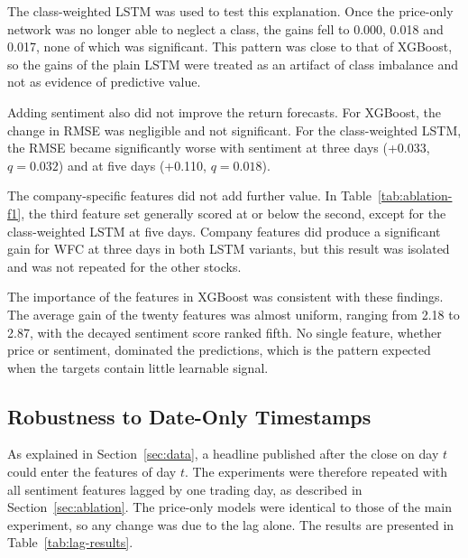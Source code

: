 The class-weighted LSTM was used to test this explanation. Once the price-only network was no longer able to neglect a class, the gains fell to 0.000, 0.018 and 0.017, none of which was significant. This pattern was close to that of XGBoost, so the gains of the plain LSTM were treated as an artifact of class imbalance and not as evidence of predictive value.

Adding sentiment also did not improve the return forecasts. For XGBoost, the change in RMSE was negligible and not significant. For the class-weighted LSTM, the RMSE became significantly worse with sentiment at three days (+0.033, $q = 0.032$) and at five days (+0.110, $q = 0.018$).

The company-specific features did not add further value. In Table~\ref{tab:ablation-f1}, the third feature set generally scored at or below the second, except for the class-weighted LSTM at five days. Company features did produce a significant gain for WFC at three days in both LSTM variants, but this result was isolated and was not repeated for the other stocks.

The importance of the features in XGBoost was consistent with these findings. The average gain of the twenty features was almost uniform, ranging from 2.18 to 2.87, with the decayed sentiment score ranked fifth. No single feature, whether price or sentiment, dominated the predictions, which is the pattern expected when the targets contain little learnable signal.

\subsection{Robustness to Date-Only Timestamps}
\label{sec:lag-results}
As explained in Section~\ref{sec:data}, a headline published after the close on day $t$ could enter the features of day $t$. The experiments were therefore repeated with all sentiment features lagged by one trading day, as described in Section~\ref{sec:ablation}. The price-only models were identical to those of the main experiment, so any change was due to the lag alone. The results are presented in Table~\ref{tab:lag-results}.


